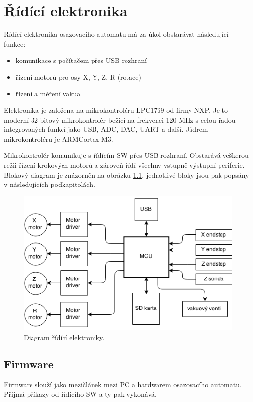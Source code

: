 \chapter{Řídící elektronika}

Řídící elektronika osazovacího automatu má za úkol obstarávat následující funkce:
\begin{itemize}
\item komunikace s počítačem přes USB rozhraní
\item řízení motorů pro osy X, Y, Z, R (rotace)
\item řízení a měření vakua
\end{itemize}


Elektronika je založena na mikrokontroléru LPC1769 od firmy NXP. Je to moderní 32-bitový mikrokontrolér bežící na frekvenci 120 MHz s celou řadou integrovaných funkcí jako USB, ADC, DAC, UART a další. Jádrem mikrokontroléru je ARM\textregistered Cortex\textregistered-M3.

Mikrokontrolér komunikuje s řídícím SW přes USB rozhraní. Obstarává veškerou režii řízení krokových motorů a zároveň řídí všechny vstupně výstupní periferie. Blokový diagram je znázorněn na obrázku \ref{fig:ridici}, jednotlivé bloky jsou pak popsány v následujících podkapitolách.

\begin{figure}[h!]

  \centering
    \includegraphics[width=0.8\linewidth]{obrazky/electronics.png}%
    \caption{Diagram řídící elektroniky.}
    \label{fig:ridici}
\end{figure}


\section{Firmware}

Firmware slouží jako mezičlánek mezi PC a hardwarem osazovacího automatu. Přijmá příkazy od řídícího SW a ty pak vykonává.

